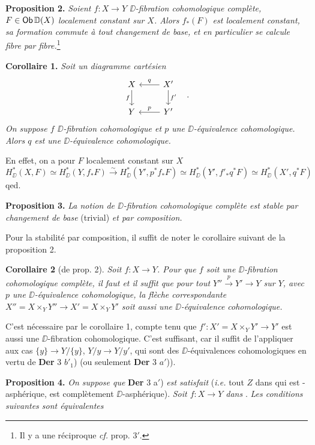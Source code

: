 \textbf{Proposition 2.} \textit{Soient $f : X \to Y$ $\DD$-fibration cohomologique complète, $F \in \mathsf{Ob}\,\mathbb{D}(X)$ localement constant sur $X$. Alors $f_*(F)$ est localement constant, sa formation commute à tout changement de base, et en particulier se calcule fibre par fibre.}\footnote[54]{Il y a une réciproque \textit{cf.} prop. 3$'$.}

\textbf{Corollaire 1.} \textit{Soit un diagramme cartésien}
\[
\begin{tikzcd}
X & X' \arrow[l, "q"'] \arrow[d, "f'"] \\
Y & Y' \arrow[l, "p"']
\arrow[from=1-1, to=2-1, "f"']
\end{tikzcd}
\quad .
\]
\textit{On suppose $f$ $\DD$-fibration cohomologique et $p$ une $\DD$-équivalence cohomologique. Alors $q$ est une $\DD$-équivalence cohomologique.}

En effet, on a pour $F$ localement constant sur $X$
\[
H^*_{\DD}(X,F) \simeq H^*_{\DD}(Y, f_*F) \overset{\sim}{\longrightarrow} H^*_{\DD}(Y', p^*f_*F) \simeq H^*_{\DD}(Y', f'_*q^*F) \simeq H^*_{\DD}(X', q^*F)
\]
qed.

\textbf{Proposition 3.} \textit{La notion de $\DD$-fibration cohomologique complète est stable par changement de base} (trivial) \textit{et par composition.}

Pour la stabilité par composition, il suffit de noter le corollaire suivant de la proposition 2.

\textbf{Corollaire 2} (de prop. 2). \textit{Soit $f : X \to Y$. Pour que $f$ soit une $\DD$-fibration cohomologique complète, il faut et il suffit que pour tout $Y'' \overset{p}{\to} Y' \to Y$ sur $Y$, avec $p$ une $\DD$-équivalence cohomologique, la flèche correspondante $X'' = X \times_Y Y'' \longrightarrow X' = X \times_Y Y'$ soit aussi une $\DD$-équivalence cohomologique.}

C’est nécessaire par le corollaire 1, compte tenu que $f' : X' = X \times_Y Y' \to Y'$ est aussi une $\DD$-fibration cohomologique. C’est suffisant, car il suffit de l’appliquer aux cas $\{y\} \to Y/\{y\}$, $Y/y \to Y/y'$, qui sont des $\DD$-équivalences cohomologiques en
vertu de \textbf{Der} 3 $b'_1$) (ou seulement \textbf{Der} 3 $a'$)).


\textbf{Proposition 4.} \textit{On suppose que} \textbf{Der} 3 a$'$) \textit{est satisfait} (\textit{i.e.} tout $Z$ dans \Dia{} qui est \Hot-asphérique, est complètement $\DD$-asphérique). \textit{Soit $f : X \to Y$ dans} \Dia. \textit{Les conditions suivantes sont équivalentes}

